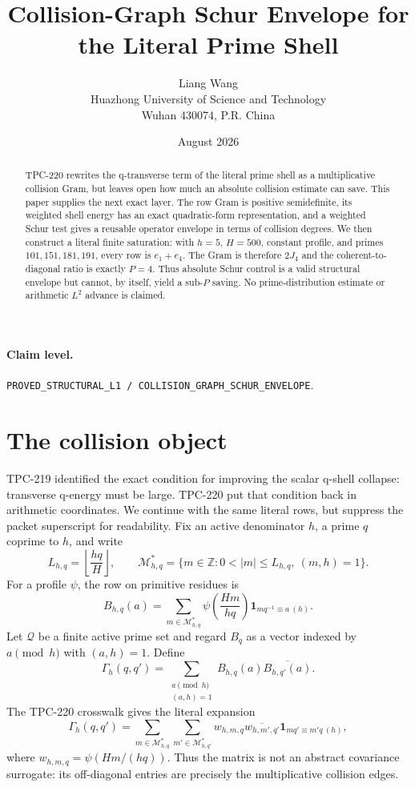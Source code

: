 \documentclass[11pt]{article}
\title{Collision-Graph Schur Envelope for the Literal Prime Shell}
\author{Liang Wang\\Huazhong University of Science and Technology\\Wuhan 430074, P.R. China}
\date{August 2026}
\newcommand{\M}{\mathcal M}
\newcommand{\G}{\Gamma}
\begin{document}
\maketitle

\begin{abstract}
TPC-220 rewrites the q-transverse term of the literal prime shell as a multiplicative
collision Gram, but leaves open how much an absolute collision estimate can save.  This
paper supplies the next exact layer.  The row Gram is positive semidefinite, its weighted
shell energy has an exact quadratic-form representation, and a weighted Schur test gives a
reusable operator envelope in terms of collision degrees.  We then construct a literal
finite saturation: with $h=5$, $H=500$, constant profile, and primes
$101,151,181,191$, every row is $e_1+e_4$.  The Gram is therefore $2J_4$ and the
coherent-to-diagonal ratio is exactly $P=4$.  Thus absolute Schur control is a valid
structural envelope but cannot, by itself, yield a sub-$P$ saving.  No prime-distribution
estimate or arithmetic $L^2$ advance is claimed.
\end{abstract}

\paragraph{Claim level.}
\texttt{PROVED\_STRUCTURAL\_L1 / COLLISION\_GRAPH\_SCHUR\_ENVELOPE}.

\section{The collision object}

TPC-219 identified the exact condition for improving the scalar q-shell collapse:
transverse q-energy must be large.  TPC-220 put that condition back in arithmetic
coordinates.  We continue with the same literal rows, but suppress the packet superscript
for readability.  Fix an active denominator $h$, a prime $q$ coprime to $h$, and write
\[
 L_{h,q}=\left\lfloor\frac{hq}{H}\right\rfloor,
 \qquad
 \M_{h,q}^{*}=\{m\in\mathbb Z:0<|m|\leq L_{h,q},\ (m,h)=1\}.
\]
For a profile $\psi$, the row on primitive residues is
\[
 B_{h,q}(a)=\sum_{m\in\M_{h,q}^{*}}
 \psi\!\left(\frac{Hm}{hq}\right)\mathbf 1_{m q^{-1}\equiv a\ (h)}.
 \tag{1}
\]
Let $\mathcal Q$ be a finite active prime set and regard $B_q$ as a vector indexed by
$a\pmod h$ with $(a,h)=1$.  Define
\[
 \G_h(q,q')=\sum_{\substack{a\pmod h\\(a,h)=1}}
 B_{h,q}(a)\overline{B_{h,q'}(a)}.
 \tag{2}
\]
The TPC-220 crosswalk gives the literal expansion
\[
 \G_h(q,q')=
 \sum_{m\in\M_{h,q}^{*}}
 \sum_{m'\in\M_{h,q'}^{*}}
 w_{h,m,q}\overline{w_{h,m',q'}}
 \mathbf 1_{m q'\equiv m'q\ (h)},
 \tag{3}
\]
where $w_{h,m,q}=\psi(Hm/(hq))$.  Thus the matrix is not an abstract covariance
surrogate: its off-diagonal entries are precisely the multiplicative collision edges.
\end{document}
